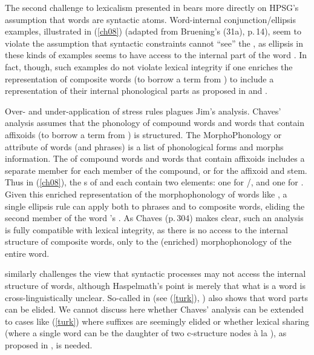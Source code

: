\documentclass[output=paper
 	        ,biblatex
                ,babelshorthands
                ,newtxmath
                ,draftmode
                ,colorlinks, citecolor=brown
]{langscibook}
\begin{document}
The second challenge to lexicalism presented in \citet{Bruening2018} bears more directly on HPSG's assumption that words are syntactic atoms. Word-internal conjunction/ellipsis examples, illustrated in (\ref{ch08}) (adapted from Bruening's (31a), p.\,14), seem to violate the assumption that syntactic constraints cannot ``see'' the , as ellipsis in these kinds of examples seems to have access to the internal part of the word . In fact, though, such examples do not violate lexical integrity if one enriches the representation of composite words (to borrow a term from \citealt[Chapter 11]{Anderson1992}) to include a representation of their internal phonological parts as proposed in \citet{Chaves2008}  and \citet{Chaves2014}.

\ea
\label{ch08}
Over- and under-application of stress rules plagues Jim's analysis.
\z
{}%
Chaves' analysis assumes that the phonology of compound words and words that contain affixoids (to borrow a term from \citealt[114--117]{Booij2005}) is structured. The MorphoPhonology or  attribute of words (and phrases) is a list of phonological forms and morphs information. The  of compound words and words that contain affixoids includes a separate member for each member of the compound, or for the affixoid and stem.  Thus in (\ref{ch08}), the s of  and  each contain two elements: one for /, and one for . Given this enriched representation of the morphophonology of words like , a single ellipsis rule can apply both to phrases and to composite words, eliding the second member of the word 's . As Chaves (p.\,304) makes clear, such an analysis is fully compatible with lexical integrity, as there is no access to the internal structure of composite words, only to the (enriched) morphophonology of the entire word.

\citet{Haspelmath2011} similarly challenges the view that syntactic processes may not access the internal structure of words, although Haspelmath's point is merely that what is a word is cross-linguistically unclear. So-called  in  (see (\ref{turk}), \citealt[48]{Haspelmath2011}) also shows that word parts can be elided. We cannot discuss here whether Chaves' analysis can be extended to cases like (\ref{turk}) where suffixes are seemingly elided or whether lexical sharing (where a single word can be the daughter of two c-structure nodes \`a la \citealt{McCawley1982}), as proposed in \citet{Broadwell2008}, is needed. 
\end{document}
